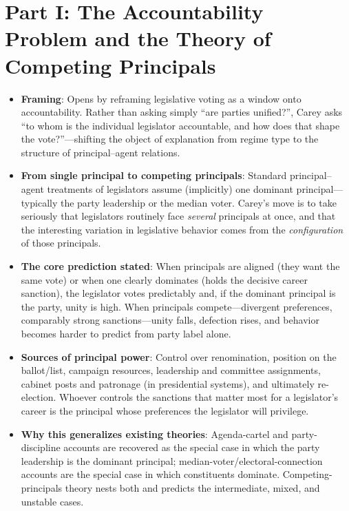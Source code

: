 \documentclass[12pt]{article}
\begin{document}
\section{Part I: The Accountability Problem and the Theory of Competing Principals}

\begin{itemize}[leftmargin=*, itemsep=4pt]
    \item \textbf{Framing}: Opens by reframing legislative voting as a window onto accountability. Rather than asking simply ``are parties unified?'', Carey asks ``to whom is the individual legislator accountable, and how does that shape the vote?''---shifting the object of explanation from regime type to the structure of principal--agent relations.
    \item \textbf{From single principal to competing principals}: Standard principal--agent treatments of legislators assume (implicitly) one dominant principal---typically the party leadership or the median voter. Carey's move is to take seriously that legislators routinely face \emph{several} principals at once, and that the interesting variation in legislative behavior comes from the \emph{configuration} of those principals.
    \item \textbf{The core prediction stated}: When principals are aligned (they want the same vote) or when one clearly dominates (holds the decisive career sanction), the legislator votes predictably and, if the dominant principal is the party, unity is high. When principals compete---divergent preferences, comparably strong sanctions---unity falls, defection rises, and behavior becomes harder to predict from party label alone.
    \item \textbf{Sources of principal power}: Control over renomination, position on the ballot/list, campaign resources, leadership and committee assignments, cabinet posts and patronage (in presidential systems), and ultimately re-election. Whoever controls the sanctions that matter most for a legislator's career is the principal whose preferences the legislator will privilege.
    \item \textbf{Why this generalizes existing theories}: Agenda-cartel and party-discipline accounts are recovered as the special case in which the party leadership is the dominant principal; median-voter/electoral-connection accounts are the special case in which constituents dominate. Competing-principals theory nests both and predicts the intermediate, mixed, and unstable cases.
\end{itemize}
\end{document}
